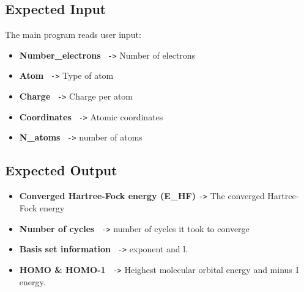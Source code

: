 \documentclass[11pt,a4paper]{article}
\begin{document}
\subsection*{Expected Input}
The main program reads user input:
\begin{itemize}
    \item \textbf{Number\_electrons} \texttt{ ->} Number of electrons
    \item \textbf{Atom} \texttt{ ->} Type of atom
    \item \textbf{Charge} \texttt{ ->} Charge per atom
    \item \textbf{Coordinates} \texttt{ ->} Atomic coordinates
    \item \textbf{N\_atoms} \texttt{ ->} number of atoms
\end{itemize}

\subsection*{Expected Output}
\begin{itemize}
    \item \textbf{Converged Hartree-Fock energy (E\_HF)} \texttt{->} The converged Hartree-Fock energy
    \item \textbf{Number of cycles} \texttt{ ->} number of cycles it took to converge
    \item \textbf{Basis set information} \texttt{ ->} exponent and l.
    \item \textbf{HOMO & HOMO-1} \texttt{ ->} Heighest molecular orbital energy and minus 1 energy.
\end{itemize}
\end{document}

